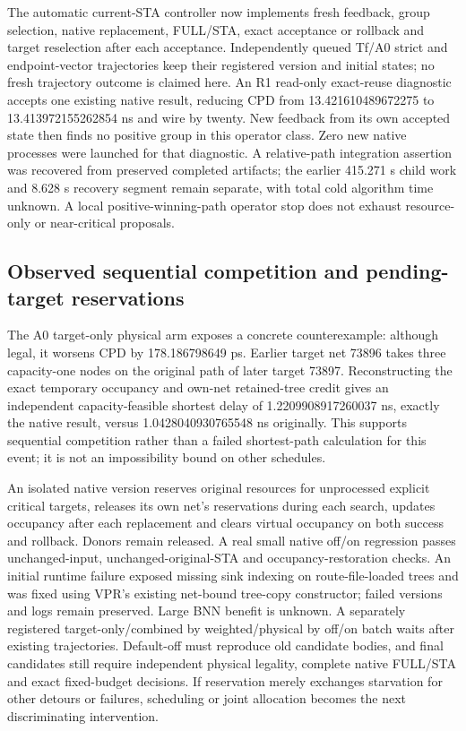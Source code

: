 The automatic current-STA controller now implements fresh feedback, group selection, native replacement, FULL/STA, exact acceptance or rollback and target reselection after each acceptance. Independently queued Tf/A0 strict and endpoint-vector trajectories keep their registered version and initial states; no fresh trajectory outcome is claimed here. An R1 read-only exact-reuse diagnostic accepts one existing native result, reducing CPD from 13.421610489672275 to 13.413972155262854 ns and wire by twenty. New feedback from its own accepted state then finds no positive group in this operator class. Zero new native processes were launched for that diagnostic. A relative-path integration assertion was recovered from preserved completed artifacts; the earlier 415.271 s child work and 8.628 s recovery segment remain separate, with total cold algorithm time unknown. A local positive-winning-path operator stop does not exhaust resource-only or near-critical proposals.

\subsection{Observed sequential competition and pending-target reservations}
The A0 target-only physical arm exposes a concrete counterexample: although legal, it worsens CPD by 178.186798649 ps. Earlier target net 73896 takes three capacity-one nodes on the original path of later target 73897. Reconstructing the exact temporary occupancy and own-net retained-tree credit gives an independent capacity-feasible shortest delay of 1.2209908917260037 ns, exactly the native result, versus 1.0428040930765548 ns originally. This supports sequential competition rather than a failed shortest-path calculation for this event; it is not an impossibility bound on other schedules.

An isolated native version reserves original resources for unprocessed explicit critical targets, releases its own net's reservations during each search, updates occupancy after each replacement and clears virtual occupancy on both success and rollback. Donors remain released. A real small native off/on regression passes unchanged-input, unchanged-original-STA and occupancy-restoration checks. An initial runtime failure exposed missing sink indexing on route-file-loaded trees and was fixed using VPR's existing net-bound tree-copy constructor; failed versions and logs remain preserved. Large BNN benefit is unknown. A separately registered target-only/combined by weighted/physical by off/on batch waits after existing trajectories. Default-off must reproduce old candidate bodies, and final candidates still require independent physical legality, complete native FULL/STA and exact fixed-budget decisions. If reservation merely exchanges starvation for other detours or failures, scheduling or joint allocation becomes the next discriminating intervention.

